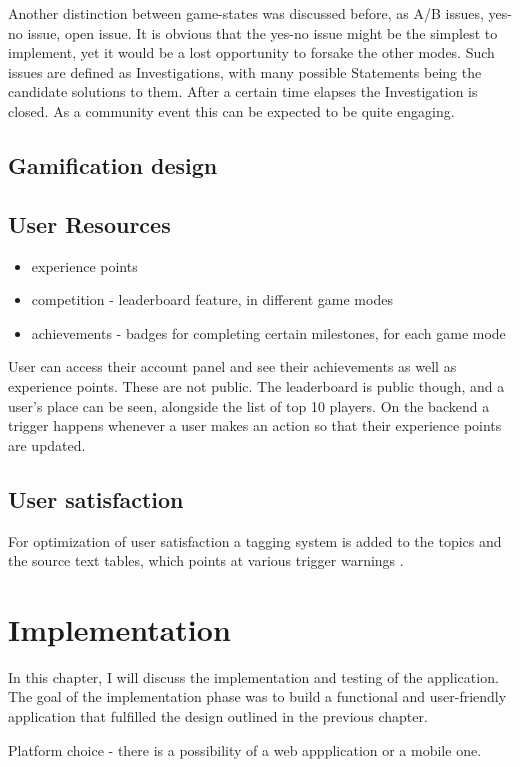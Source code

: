 \documentclass{report}
\begin{document}
{Another distinction between game-states was discussed before, as A/B issues, yes-no issue, open issue. It is obvious that the yes-no issue might be the simplest to implement, yet it would be a lost opportunity to forsake the other modes.
Such issues are defined as Investigations, with many possible Statements being the candidate solutions to them. After a certain time elapses the Investigation is closed. As a community event this can be expected to be quite engaging.

\section{Gamification design}

\section{User Resources}
\begin{itemize}
  \item experience points 
  \item competition - leaderboard feature, in different game modes
  \item achievements - badges for completing certain milestones, for each game mode
\end{itemize}

User can access their account panel and see their achievements as well as experience points. These are not public. The leaderboard is public though, and a user's place can be seen, alongside the list of top 10 players. On the backend a trigger happens whenever a user makes an action so that their experience points are updated.
\section{User satisfaction}
For optimization of user satisfaction a tagging system is added to the topics and the source text tables, which points at various trigger warnings \cite{annemieke_small_2019}.
\newpage

\chapter{Implementation}
In this chapter, I will discuss the implementation and testing of the application. The goal of the implementation phase was to build a functional and user-friendly application that fulfilled the design outlined in the previous chapter.

Platform choice - there is a possibility of a web appplication or a mobile one.

}
\end{document}
